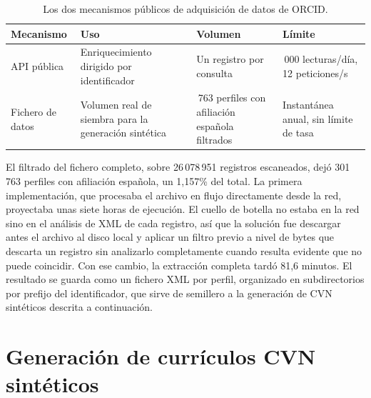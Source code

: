 \begin{table}[H]
  \centering
  \small
  \renewcommand{\arraystretch}{1.2}
  \begin{tabular}{
    p{}
    >{\raggedright\arraybackslash}p{}
    >{\raggedright\arraybackslash}p{}
    >{\raggedright\arraybackslash}p{}}
    \hline
    \textbf{Mecanismo} & \textbf{Uso} & \textbf{Volumen} & \textbf{Límite} \\
    \hline
    API pública & Enriquecimiento dirigido por identificador &
      Un registro por consulta &
      25\,000 lecturas/día, 12 peticiones/s \\
    Fichero de datos & Volumen real de siembra para la generación sintética &
      301\,763 perfiles con afiliación española filtrados &
      Instantánea anual, sin límite de tasa \\
    \hline
  \end{tabular}
  \caption{Los dos mecanismos públicos de adquisición de datos de ORCID.}
  \label{tab:tfm_mecanismos_orcid}
\end{table}

El filtrado del fichero completo, sobre 26\,078\,951 registros escaneados,
dejó 301\,763 perfiles con afiliación española, un 1,157\% del total. La
primera implementación, que procesaba el archivo en flujo directamente
desde la red, proyectaba unas siete horas de ejecución. El cuello de
botella no estaba en la red sino en el análisis de XML de cada registro,
así que la solución fue descargar antes el archivo al disco local y
aplicar un filtro previo a nivel de bytes que descarta un registro sin
analizarlo completamente cuando resulta evidente que no puede coincidir.
Con ese cambio, la extracción completa tardó 81,6 minutos. El resultado se
guarda como un fichero XML por perfil, organizado en subdirectorios por
prefijo del identificador, que sirve de semillero a la generación de CVN
sintéticos descrita a continuación.

\section{Generación de currículos CVN sintéticos}
\label{sec:ingesta_sintetico}

